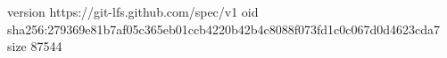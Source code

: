 version https://git-lfs.github.com/spec/v1
oid sha256:279369e81b7af05c365eb01ccb4220b42b4c8088f073fd1c0c067d0d4623cda7
size 87544
